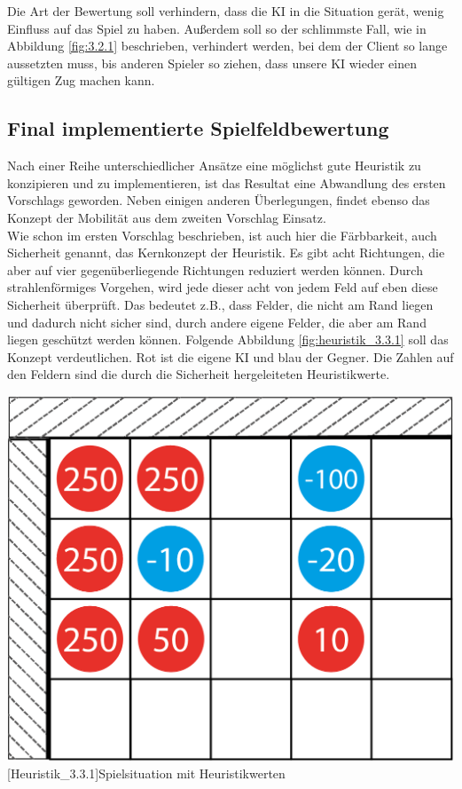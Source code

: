 \documentclass[12pt,a4paper,bibliography=totocnumbered,listof=totocnumbered]{scrartcl}
\begin{document}
    Die Art der Bewertung soll verhindern, dass die KI in die Situation gerät, wenig Einfluss auf das Spiel zu haben. Außerdem soll so der schlimmste Fall, wie in Abbildung \ref{fig:3.2.1} beschrieben, verhindert werden, bei dem der Client so lange aussetzten muss, bis anderen Spieler so ziehen, dass unsere KI wieder einen gültigen Zug machen kann.
    
    \newpage
    
    \subsection{Final implementierte Spielfeldbewertung}
    \vspace{1em}

	Nach einer Reihe unterschiedlicher Ansätze eine möglichst gute Heuristik zu konzipieren und zu implementieren, ist das Resultat eine Abwandlung des ersten Vorschlags geworden. Neben einigen anderen Überlegungen, findet ebenso das Konzept der Mobilität aus dem zweiten Vorschlag Einsatz.\\
	Wie schon im ersten Vorschlag beschrieben, ist auch hier die \glqq Färbbarkeit\grqq, auch \glqq Sicherheit\grqq{}  genannt, das Kernkonzept der Heuristik. Es gibt acht Richtungen, die aber auf vier gegenüberliegende Richtungen reduziert werden können. Durch strahlenförmiges Vorgehen, wird jede dieser acht von jedem Feld auf eben diese \glqq Sicherheit\grqq{}  überprüft. Das bedeutet z.B., dass Felder, die nicht am Rand liegen und dadurch nicht sicher sind, durch andere eigene Felder, die aber am Rand liegen geschützt werden können. Folgende Abbildung  \ref{fig:heuristik_3.3.1} soll das Konzept verdeutlichen. Rot ist die eigene KI und blau der Gegner. Die Zahlen auf den Feldern sind die durch die \glqq Sicherheit\grqq{} hergeleiteten Heuristikwerte.
	
	\vspace{1em}
	\begin{minipage}{\linewidth}
		\centering
		\includegraphics[width=0.4\linewidth]{pics/Kapitel_3/Kapitel_3_pic8.png}
		[Heuristik_3.3.1]{Spielsituation mit Heuristikwerten\footnotemark }
		\label{fig:heuristik_3.3.1}
	\end{minipage}
	\vspace{1em}
\end{document}
